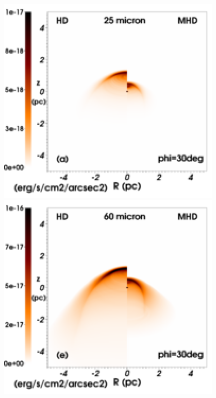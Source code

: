 \documentclass[useAMS,usenatbib]{mn2e}
\begin{document}
\begin{figure}
		\centering
	\begin{minipage}[b]{ 0.32\textwidth}
			\centering
	        \includegraphics[width=1.0\textwidth]{./map_2040_30deg_lambda25_legend.eps}
	\end{minipage}
	\begin{minipage}[b]{ 0.32\textwidth}
			\centering
	        \includegraphics[width=1.0\textwidth]{./map_2040_30deg_lambda60_legend.eps}

\end{minipage}
\end{figure}
\end{document}
